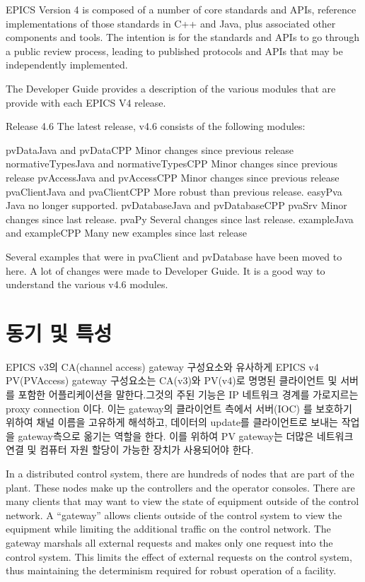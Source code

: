 \documentclass[11pt
  , a4paper
  , article
  , oneside
]{memoir}
\begin{document}
EPICS Version 4 is composed of a number of core standards and APIs, reference implementations of those standards in C++ and Java, plus associated other components and tools. The intention is for the standards and APIs to go through a public review process, leading to published protocols and APIs that may be independently implemented.

The Developer Guide provides a description of the various modules that are provide with each EPICS V4 release.


Release 4.6
The latest release, v4.6 consists of the following modules:

pvDataJava and pvDataCPP
Minor changes since previous release
normativeTypesJava and normativeTypesCPP
Minor changes since previous release
pvAccessJava and pvAccessCPP
Minor changes since previous release
pvaClientJava and pvaClientCPP
More robust than previous release.
easyPva Java no longer supported.
pvDatabaseJava and pvDatabaseCPP
pvaSrv
Minor changes since last release.
pvaPy
Several changes since last release.
exampleJava and exampleCPP
Many new examples since last release

Several examples that were in pvaClient and pvDatabase have been moved to here.
A lot of changes were made to Developer Guide. It is a good way to understand the various v4.6 modules.



\section{동기 및 특성}
EPICS v3의 CA(channel access) gateway 구성요소와 유사하게 EPICS v4 PV(PVAccess) gateway 구성요소는 CA(v3)와 PV(v4)로 명명된 클라이언트 및 서버를 포함한 어플리케이션을 말한다.그것의 주된 기능은 IP 네트워크 경계를 가로지르는 proxy connection 이다. 이는 gateway의 클라이언트 측에서 서버(IOC) 를 보호하기 위하여 채널 이름을 고유하게 해석하고, 데이터의 update를 클라이언트로 보내는 작업을 gateway측으로 옮기는 역할을 한다. 이를 위하여 PV gateway는 더많은 네트워크 연결 및 컴퓨터 자원 할당이 가능한 장치가 사용되어야 한다. 

In a distributed control system, there are hundreds of nodes that are part of the
plant. These nodes make up the controllers and the operator consoles. There
are many clients that may want to view the state of equipment outside of the
control network. A “gateway” allows clients outside of the control system to
view the equipment while limiting the additional traffic on the control network.
The gateway marshals all external requests and makes only one request into the
control system. This limits the effect of external requests on the control system,
thus maintaining the determinism required for robust operation of a facility.
\end{document}
